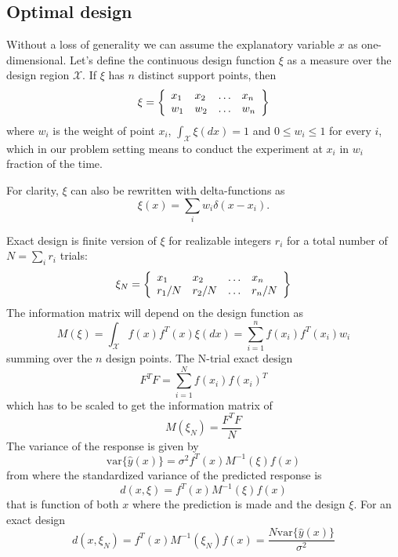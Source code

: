 \documentclass[12pt]{iopart}
\begin{document}
\subsection{Optimal design}
Without a loss of generality we can assume the explanatory variable $x$ as one-dimensional. 
Let's define the continuous design function $\xi$ as a measure over the design region $\mathcal{X}$. If $\xi$ has $n$ distinct support points, then
\begin{equation}
\xi = \left\{
  \begin{array}{l l l l}
    x_1 & x_2 & \ldots & x_n\\
    w_1 & w_2 & \ldots & w_n\\
  \end{array} \right \}
\end{equation}
where $w_i$ is the weight of point $x_i$, $\int_{\mathcal{X}}\xi(dx) = 1$ and $0 \leq w_i \leq 1$ for every $i$, which in our problem setting means to conduct the experiment at $x_i$ in $w_i$ fraction of the time.

For clarity, $\xi$ can also be rewritten with delta-functions as
\begin{equation}
\xi(x) = \sum_i w_i \delta(x - x_i).
\label{eq:xidelta}
\end{equation}

Exact design is finite version of $\xi$ for realizable integers $r_i$ for a total number of $N = \sum_i r_i$ trials:
\begin{equation}
\xi_N = \left\{
  \begin{array}{l l l l}
    x_1 & x_2 & \ldots & x_n\\
    r_1/N & r_2/N & \ldots & r_n/N\\
  \end{array} \right \}
\end{equation}
The information matrix will depend on the design function as
\begin{equation}
M(\xi) = \int_{\mathcal{X}} f(x)f^T(x) \xi(dx) = \sum_{i=1}^n f(x_i)f^T(x_i)w_i
\label{eq:infcont}
\end{equation}
summing over the $n$ design points.
The N-trial exact design
\begin{equation}
F^T F = \sum_{i=1}^N f(x_i) f(x_i)^T
\end{equation}
which has to be scaled to get the information matrix of
\begin{equation}
M(\xi_N) = \frac{F^T F}{N}
\end{equation}
The variance of the response is given by
\begin{equation}
\mathrm{var}\{\hat y(x)\} = \sigma^2 f^T(x) M^{-1}(\xi) f(x)
\end{equation}
from where the standardized variance of the predicted response is
\begin{equation}
d(x, \xi) = f^T(x) M^{-1}(\xi) f(x)
\label{eq:stdvar}
\end{equation}
that is function of both $x$ where the prediction is made and the design $\xi$.
For an exact design
\begin{equation}
d(x, \xi_N) = f^T(x) M^{-1}(\xi_N) f(x) = \frac{N \mathrm{var}\{\hat y(x)\}}{\sigma^2}
\end{equation}
\end{document}

